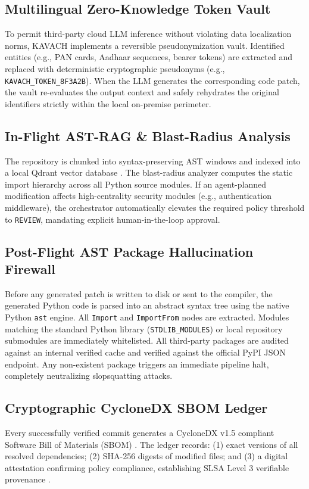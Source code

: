 \documentclass[conference]{IEEEtran}
\begin{document}
\subsection{Multilingual Zero-Knowledge Token Vault}
To permit third-party cloud LLM inference without violating data localization norms, KAVACH implements a reversible pseudonymization vault. Identified entities (e.g., PAN cards, Aadhaar sequences, bearer tokens) are extracted and replaced with deterministic cryptographic pseudonyms (e.g., \texttt{KAVACH\_TOKEN\_8F3A2B}). When the LLM generates the corresponding code patch, the vault re-evaluates the output context and safely rehydrates the original identifiers strictly within the local on-premise perimeter.

\subsection{In-Flight AST-RAG \& Blast-Radius Analysis}
The repository is chunked into syntax-preserving AST windows and indexed into a local Qdrant vector database \cite{qdrant2023vectordb}. The blast-radius analyzer computes the static import hierarchy across all Python source modules. If an agent-planned modification affects high-centrality security modules (e.g., authentication middleware), the orchestrator automatically elevates the required policy threshold to \texttt{REVIEW}, mandating explicit human-in-the-loop approval.

\subsection{Post-Flight AST Package Hallucination Firewall}
Before any generated patch is written to disk or sent to the compiler, the generated Python code is parsed into an abstract syntax tree using the native Python \texttt{ast} engine. All \texttt{Import} and \texttt{ImportFrom} nodes are extracted. Modules matching the standard Python library (\texttt{STDLIB\_MODULES}) or local repository submodules are immediately whitelisted. All third-party packages are audited against an internal verified cache and verified against the official PyPI JSON endpoint. Any non-existent package triggers an immediate pipeline halt, completely neutralizing slopsquatting attacks.

\subsection{Cryptographic CycloneDX SBOM Ledger}
Every successfully verified commit generates a CycloneDX v1.5 compliant Software Bill of Materials (SBOM) \cite{cyclonedx2024sbom}. The ledger records: (1) exact versions of all resolved dependencies; (2) SHA-256 digests of modified files; and (3) a digital attestation confirming policy compliance, establishing SLSA Level 3 verifiable provenance \cite{slsa2024framework}.
\end{document}
